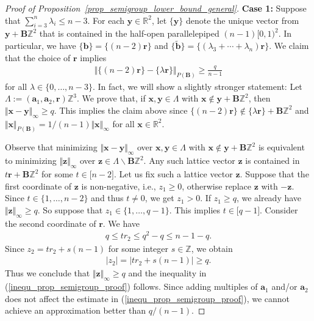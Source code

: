 \documentclass[pdflatex]{sn-jnl}
\newcommand{\R}{\mathbb{R}}
\newcommand{\Z}{\mathbb{Z}}
\newcommand{\bx}{\bm{x}}
\newcommand{\by}{\bm{y}}
\newcommand{\bb}{\bm{b}}
\newcommand{\ba}{\bm{a}}
\newcommand{\bz}{\bm{z}}
\newcommand{\br}{\bm{r}}
\newcommand{\bB}{\bm{B}}
\theoremstyle{thmstyleone}%
\theoremstyle{thmstyletwo}%
\theoremstyle{thmstylethree}%
\begin{document}
\begin{proof}[Proof of Proposition~\ref{prop_semigroup_lower_bound_general}]
		\textbf{Case 1:} Suppose that $\sum_{i=3}^n\lambda_i \leq n-3$.  
		For each $\by\in \R^2$, let $\lbrace\by\rbrace$ denote the unique vector from $\by + \bB\Z^2$ that is contained in the half-open parallelepiped $(n-1)\lbrack 0,1 )^2$. 
		In particular, we have $\lbrace\bb\rbrace = \lbrace (n-2)\br\rbrace$ and $\lbrace\tilde{\bb}\rbrace = \lbrace(\lambda_3+ \cdots+ \lambda_n)\br\rbrace$.  
		We claim that the choice of $\br$ implies 
		\begin{align}
			\label{inequ_prop_semigroup_proof}
			\Vert \lbrace(n-2)\br\rbrace - \lbrace\lambda\br\rbrace\Vert_{P(\bB)} \geq \frac{q}{n-1}
		\end{align}
		for all $\lambda\in\lbrace 0,\ldots, n-3\rbrace$. 
		In fact, we will show a slightly stronger statement: Let $\Lambda := (\ba_1,\ba_2,\br)\Z^3$. We prove that, if $\bx,\by\in \Lambda$ with $\bx\notin \by + \bB\Z^2$, then $\Vert \bx-\by\Vert_\infty\geq q$. This implies the claim above since $\lbrace(n-2)\br\rbrace\notin \lbrace\lambda\br\rbrace + \bB\Z^2$ and 
		$\Vert\bx\Vert_{P(\bB)} = 1/(n-1)\Vert\bx\Vert_\infty$ for all $\bx\in\R^2$. 
		
		Observe that minimizing $\Vert \bx-\by\Vert_\infty$ over $\bx,\by\in \Lambda$ with $\bx\notin \by + \bB\Z^2$ is equivalent to minimizing $\Vert \bz\Vert_\infty$ over $\bz\in\Lambda\backslash \bB\Z^2$. Any such lattice vector $\bz$ is contained in $t\br + \bB\Z^2$ for some $t\in\lbrack n-2\rbrack$. Let us fix such a lattice vector $\bz$. Suppose that the first coordinate of $\bz$ is non-negative, i.e., $z_1 \geq 0$, otherwise replace $\bz$ with $-\bz$. Since $t\in\lbrace 1,\ldots,n-2\rbrace$ and thus $t \neq 0$, we get $z_1 > 0$. If $z_1 \geq q$, we already have $\Vert\bz\Vert_\infty\geq q$. So suppose that $z_1 \in\lbrace 1,\ldots,q-1\rbrace$. This implies $t\in\lbrack q-1\rbrack$. 
		Consider the second coordinate of $\br$. We have
		\begin{align*}
			q \leq tr_2 \leq q^2 - q \leq n - 1 - q.
		\end{align*}
		Since $z_2 = tr_2 + s (n-1)$ for some integer $s\in\Z$, we obtain 
		\begin{align*}
			|z_2| = |tr_2 + s (n-1)|\geq q.
		\end{align*}
		Thus we conclude that $\Vert \bz\Vert_\infty\geq q$ and the inequality in (\ref{inequ_prop_semigroup_proof}) follows. Since adding multiples of $\ba_1$ and/or $\ba_2$ does not affect the estimate in (\ref{inequ_prop_semigroup_proof}), 
		we cannot achieve an approximation better than $q/(n-1)$.
		

\end{proof}
\end{document}
